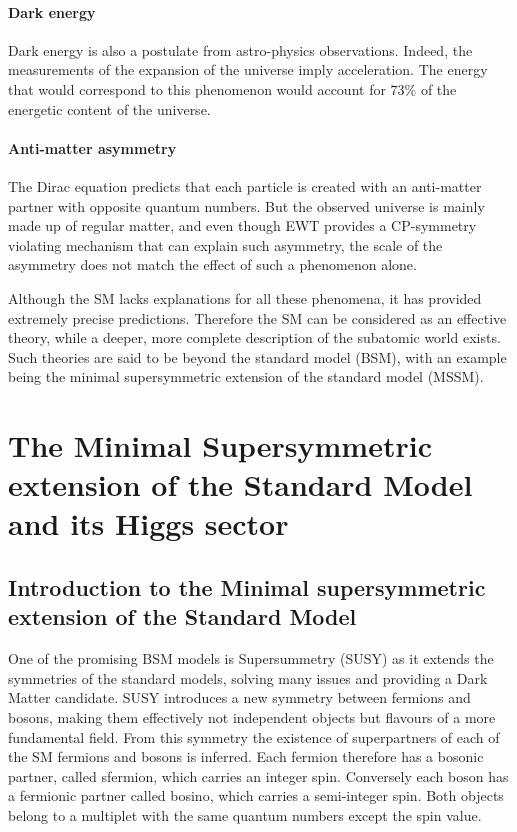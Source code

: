 \paragraph{Dark energy} Dark energy is also a postulate from astro-physics observations. Indeed, the measurements of the expansion of the universe imply acceleration. The energy that would correspond to this phenomenon would account for $73\%$ of the energetic content of the universe. 

\paragraph{Anti-matter asymmetry} The Dirac equation predicts that each particle is created with an anti-matter partner with opposite quantum numbers. But the observed universe is mainly made up of regular matter, and even though EWT provides a CP-symmetry violating mechanism that can explain such asymmetry, the scale of the asymmetry does not match the effect of such a phenomenon alone.\newline

Although the SM lacks explanations for all these phenomena, it has provided extremely precise predictions. Therefore the SM can be considered as an effective theory, while a deeper, more complete description of the subatomic world exists. Such theories are said to be beyond the standard model (BSM), with an example being the minimal supersymmetric extension of the standard model (MSSM).


\section{The Minimal Supersymmetric extension of the Standard Model and its Higgs sector}
\label{sec:MSSM}

\subsection{Introduction to the Minimal supersymmetric extension of the Standard Model}

One of the promising BSM models is Supersummetry (SUSY) as it extends the symmetries of the standard models, solving many issues and providing a Dark Matter candidate. SUSY \cite{Martin:1997ns} introduces a new symmetry between fermions and bosons, making them effectively not independent objects but flavours of a more fundamental field. From this symmetry the existence of superpartners of each of the SM fermions and bosons is inferred. Each fermion therefore has a bosonic partner, called sfermion, which carries an integer spin. Conversely each boson has a fermionic partner called bosino, which carries a semi-integer spin. Both objects belong to a multiplet with the same quantum numbers except the spin value.\newline

